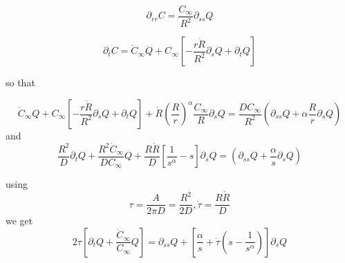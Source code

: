 \documentclass[11pt]{revtex4}
\begin{document}
\begin{equation}
	\partial_{rr} C = \dfrac{C_\infty}{R^2} \partial_{ss} Q 
\end{equation}

\begin{equation}
	\partial_t C  = \dot{C}_\infty Q + C_\infty \left[ -\dfrac{r \dot{R}}{R^2} \partial_s Q + \partial_t Q \right]
\end{equation}

so that

\begin{equation}
	\dot{C}_\infty Q + C_\infty \left[ -\dfrac{r \dot{R}}{R^2} \partial_s Q + \partial_t Q \right] + 
	\dot{R} \left(\dfrac{R}{r}\right)^\alpha \dfrac{C_\infty}{R} \partial_s Q 
	= \dfrac{DC_\infty}{R^2} \left(\partial_{ss}Q + \alpha\dfrac{R}{r} \partial_s Q\right)
\end{equation}
and
\begin{equation}
 \dfrac{R^2}{D} \partial_t Q + \dfrac{R^2 \dot{C}_\infty}{D C_\infty} Q 
 + \dfrac{R\dot{R}}{D}\left[ \dfrac{1}{s^\alpha} -s\right] \partial_s Q
 = \left(\partial_{ss}Q + \dfrac{\alpha}{s} \partial_s Q\right)
\end{equation}

using
\begin{equation}
	\tau = \dfrac{A}{2\pi D} = \dfrac{R^2}{2D}, \dot{\tau} = \dfrac{R\dot{R}}{D}
\end{equation}
we get
\begin{equation}
	2\tau\left[\partial_t Q + \dfrac{\dot{C}_\infty}{C_\infty} Q \right] = \partial_{ss}Q + \left[\dfrac{\alpha}{s} + \dot{\tau}\left(s-\dfrac{1}{s^\alpha}\right) \right] \partial_s Q
\end{equation}
\end{document}
